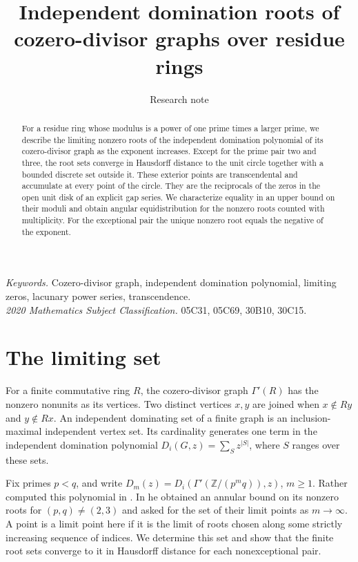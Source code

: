 \documentclass[11pt]{article}
\title{Independent domination roots of\\cozero-divisor graphs over residue rings}
\author{}
\date{Research note}
\newcommand{\Z}{\mathbb Z}
\begin{document}
\maketitle
\begin{abstract}
\noindent
For a residue ring whose modulus is a power of one prime times a larger
prime, we describe the limiting nonzero roots of the independent
domination polynomial of its cozero-divisor graph as the exponent
increases. Except for the prime pair two and three, the root sets
converge in Hausdorff distance to the unit circle together with a
bounded discrete set outside it. These exterior points are
transcendental and accumulate at every point of the circle. They are
the reciprocals of the zeros in the open unit disk of an explicit gap
series. We characterize equality in an upper bound on their moduli
and obtain angular equidistribution for the nonzero roots counted with
multiplicity. For the exceptional pair the unique nonzero root equals
the negative of the exponent.

\end{abstract}
\begin{center}\small
\textit{Keywords.} Cozero-divisor graph, independent domination polynomial,
limiting zeros, lacunary power series, transcendence.\\
\textit{2020 Mathematics Subject Classification.} 05C31, 05C69, 30B10, 30C15.
\end{center}

\section{The limiting set}

For a finite commutative ring \(R\), the cozero-divisor graph
\(\Gamma'(R)\) has the nonzero nonunits as its vertices.
Two distinct vertices \(x,y\) are joined when \(x\notin Ry\) and
\(y\notin Rx\). An independent dominating set of a finite graph is
an inclusion-maximal independent vertex set. Its cardinality generates
one term in the independent domination polynomial
\(D_i(G,z)=\sum_{S} z^{|S|}\), where \(S\) ranges over these sets.

Fix primes \(p<q\), and write \(D_m(z)=D_i(\Gamma'(\Z/(p^m q)),z)\),
\(m\ge1\). Rather computed this polynomial in \cite[Theorem~2.4]{rather24}.
In \cite{rather26} he obtained an annular bound on its nonzero roots
for \((p,q)\ne(2,3)\) and asked for the set of their limit points as
\(m\to\infty\). A point is a limit point here if it is the limit of
roots chosen along some strictly increasing sequence of indices.
We determine this set and show that the finite root sets converge to
it in Hausdorff distance for each nonexceptional pair.
\end{document}
